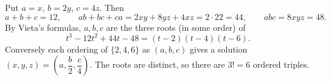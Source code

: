 Put $a=x$, $b=2y$, $c=4z$. Then
\[
a+b+c=12,\qquad ab+bc+ca=2xy+8yz+4xz=2\cdot22=44,\qquad abc=8xyz=48 .
\]
By Vieta's formulas, $a,b,c$ are the three roots (in some order) of
\[
t^3-12t^2+44t-48=(t-2)(t-4)(t-6).
\]
Conversely each ordering of $\{2,4,6\}$ as $(a,b,c)$ gives a solution $(x,y,z)=\left(a,\dfrac {b}{2},\dfrac {c}{4}\right)$. The roots are distinct, so there are $3!=\boxed{6}$ ordered triples.
